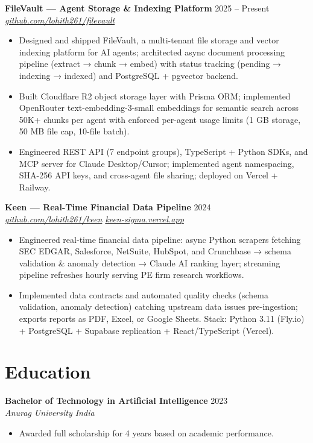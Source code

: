 \documentclass[10pt,letterpaper]{article}
\newcommand{\entry}[3]{%
  \vspace{3pt}\textbf{#1} \hfill #3 \\
  \textit{\small #2}\vspace{1pt}}
\begin{document}
\entry{FileVault --- Agent Storage \& Indexing Platform}{\href{https://github.com/lohith261/filevault}{github.com/lohith261/filevault}}{2025 -- Present}
\begin{itemize}
  \item Designed and shipped FileVault, a multi-tenant file storage and vector indexing platform for AI agents; architected async document processing pipeline (extract → chunk → embed) with status tracking (pending → indexing → indexed) and PostgreSQL + pgvector backend.
  \item Built Cloudflare R2 object storage layer with Prisma ORM; implemented OpenRouter text-embedding-3-small embeddings for semantic search across 50K+ chunks per agent with enforced per-agent usage limits (1 GB storage, 50 MB file cap, 10-file batch).
  \item Engineered REST API (7 endpoint groups), TypeScript + Python SDKs, and MCP server for Claude Desktop/Cursor; implemented agent namespacing, SHA-256 API keys, and cross-agent file sharing; deployed on Vercel + Railway.
\end{itemize}

\entry{Keen --- Real-Time Financial Data Pipeline}{\href{https://github.com/lohith261/keen}{github.com/lohith261/keen} \quad\textbullet\quad \href{https://keen-sigma.vercel.app/}{keen-sigma.vercel.app}}{2024}
\begin{itemize}
  \item Engineered real-time financial data pipeline: async Python scrapers fetching SEC EDGAR, Salesforce, NetSuite, HubSpot, and Crunchbase → schema validation \& anomaly detection → Claude AI ranking layer; streaming pipeline refreshes hourly serving PE firm research workflows.
  \item Implemented data contracts and automated quality checks (schema validation, anomaly detection) catching upstream data issues pre-ingestion; exports reports as PDF, Excel, or Google Sheets. Stack: Python 3.11 (Fly.io) + PostgreSQL + Supabase replication + React/TypeScript (Vercel).
\end{itemize}

\section{Education}

\entry{Bachelor of Technology in Artificial Intelligence}{Anurag University \textbullet{} India}{2023}
\begin{itemize}
  \item Awarded full scholarship for 4 years based on academic performance.
\end{itemize}
\end{document}
